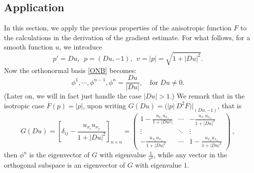 \documentclass[12pt]{article}
\numberwithin{equation}{section}
\theoremstyle{plain}
\theoremstyle{definition}
\theoremstyle{remark}
\begin{document}
\subsection{Application} \label{Sec:2.2}
In this section, we apply the previous properties of the anisotropic function 
$F$ to the calculations in the derivation of the gradient estimate. 
For what follows, for a smooth function $u$, we introduce
\begin{equation*}
    p'=Du,\,\,\,p=(Du,-1),\,\,\,v=|p|= \sqrt{1+|Du|^2}.
\end{equation*}
Now the orthonormal basis \eqref{ONB} becomes:
\begin{equation}
\label{ONB2}
    \phi^1, \cdots, \phi^{n-1}, \phi^n = \frac{Du}{|Du|},
    \quad\text{for $Du\neq 0$}.
\end{equation}
(Later on, we will in fact just handle the case $|Du|>1$.)
We remark that in the isotropic case $\overline{F}(p)=|p|$, upon writing
$G(Du) = \big(|p| \ D^2 \overline{F}\big) \Big|_{(Du,-1)} $, that is 
\begin{equation*}
    G(Du) = \left[ \delta_{ij} - \frac{u_{x_i} u_{x_j}}{1+|Du|^2} \right]_{n\times n} = \left( \begin{array}{ccc}
       1 - \frac{u_{x_1} u_{x_1}}{1+|Du^2|}  & \cdots & -\frac{u_{x_1} u_{x_n}}{1+|Du|^2}  \\
        \vdots & \ddots & \vdots \\
        -\frac{u_{x_n} u_{x_1}}{1+|Du|^2} & \cdots & 1 - \frac{u_{x_n} u_{x_n}}{1+|Du|^2}
    \end{array}    \right)\ ,
\end{equation*}
then $\phi^n$ is the eigenvector of $G$ with eigenvalue $\frac{1}{v^2}$, while any vector in the orthogonal subspace is an eigenvector of $G$ with eigenvalue $1$. 
\end{document}
